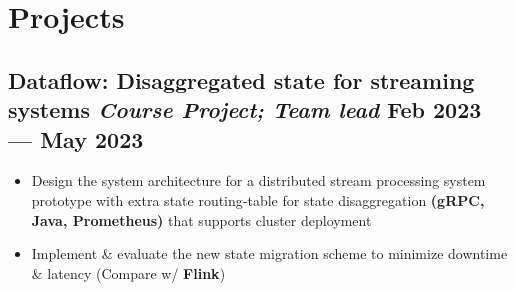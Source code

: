 \documentclass[a4,12pt]{article}
\newcommand{\subtext}[1]{
#1\par\vspace{-0.3cm}}
\newenvironment{zitemize}{
\begin{itemize}\itemsep0pt \parskip0pt \parsep1pt}
{\end{itemize}\vspace{-0.5cm}}
\begin{document}





\vspace{-0.2cm}

\section{\textbf{Projects}}


\vspace{-0.1cm}
\subsection*{Dataflow: Disaggregated state for streaming systems \normalfont\textit{Course Project; Team lead} \hfill \textbf{Feb 2023 --- May 2023}} 
\begin{zitemize}
    \item Design the system architecture for a distributed stream processing system prototype with extra state routing-table for state disaggregation \textbf{(gRPC, Java, Prometheus)} that supports cluster deployment
    \item Implement \& evaluate the new state migration scheme to minimize downtime \& latency (Compare w/ \textbf{Flink})
\end{zitemize}
\end{document}
